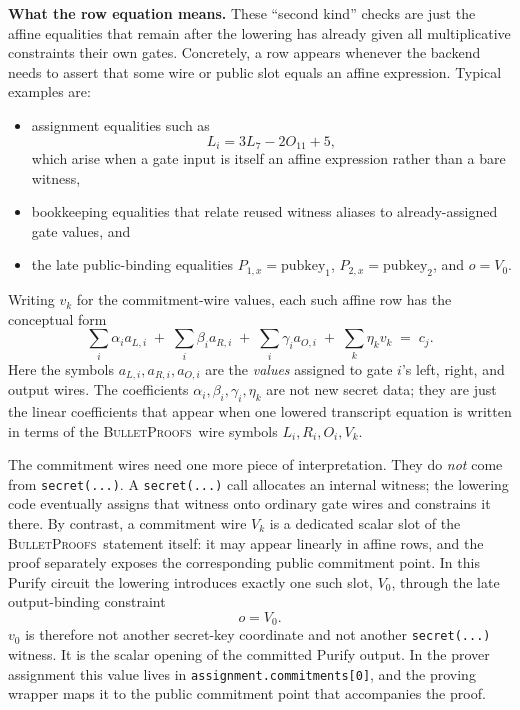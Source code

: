 \documentclass[11pt]{article}
\DeclareRobustCommand{\bp}{{\normalfont\scshape BulletProofs}}
\begin{document}
\medskip\noindent\textbf{What the row equation means.}
These ``second kind'' checks are just the
affine equalities that remain after the lowering has already given all multiplicative constraints their
own gates. Concretely, a row appears whenever the backend needs to assert that some wire or public
slot equals an affine expression. Typical examples are:
\begin{itemize}[nosep]
  \item assignment equalities such as
  \[
  L_i = 3L_7 - 2O_{11} + 5,
  \]
  which arise when a gate input is itself an affine expression rather than a bare witness,
  \item bookkeeping equalities that relate reused witness aliases to already-assigned gate values,
  and
  \item the late public-binding equalities $P_{1,x}=\text{pubkey}_1$,
  $P_{2,x}=\text{pubkey}_2$, and $o=V_0$.
\end{itemize}

Writing $v_k$ for the commitment-wire values, each such affine row has the conceptual form
\[
\sum_i \alpha_{i} a_{L,i}
\;+\;
\sum_i \beta_{i} a_{R,i}
\;+\;
\sum_i \gamma_{i} a_{O,i}
\;+\;
\sum_k \eta_{k} v_k
\;=\;
c_j.
\]
Here the symbols $a_{L,i}, a_{R,i}, a_{O,i}$ are the \emph{values} assigned to gate $i$'s left,
right, and output wires. The coefficients $\alpha_i,\beta_i,\gamma_i,\eta_k$ are not new secret
data; they are just the linear coefficients that appear when one lowered transcript equation is
written in terms of the \bp\ wire symbols $L_i,R_i,O_i,V_k$.

The commitment wires need one more piece of interpretation. They do \emph{not} come from
\texttt{secret(...)}. A \texttt{secret(...)} call allocates an internal witness; the lowering code
eventually assigns that witness onto ordinary gate wires and constrains it there. By contrast, a commitment wire $V_k$ is a
dedicated scalar slot of the \bp\ statement itself: it may appear linearly in affine rows,
and the proof separately exposes the corresponding public commitment point. In this Purify
circuit the lowering introduces exactly one such slot, $V_0$, through the late
output-binding constraint
\[
o = V_0.
\]
$v_0$ is therefore not another secret-key coordinate and not another \texttt{secret(...)} witness. It is
the scalar opening of the committed Purify output. In the prover assignment this value lives in
\texttt{assignment.commitments[0]}, and the proving wrapper maps it to the public commitment point that
accompanies the proof.
\end{document}
